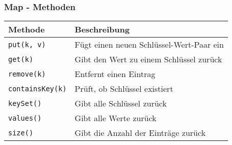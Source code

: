 \documentclass{../../presentation}
\begin{document}
\begin{frame}
	\frametitle{Map - Methoden}
	\begin{table}[h]
		\centering
		\begin{tabular}{l l}
			\rowcolor{tablehead}
			\textbf{Methode}        & \textbf{Beschreibung}                    \\
			\hline
			\texttt{put(k, v)}      & Fügt einen neuen Schlüssel-Wert-Paar ein \\
			\texttt{get(k)}         & Gibt den Wert zu einem Schlüssel zurück  \\
			\texttt{remove(k)}      & Entfernt einen Eintrag                   \\
			\texttt{containsKey(k)} & Prüft, ob Schlüssel existiert            \\
			\texttt{keySet()}       & Gibt alle Schlüssel zurück               \\
			\texttt{values()}       & Gibt alle Werte zurück                   \\
			\texttt{size()}         & Gibt die Anzahl der Einträge zurück      \\
		\end{tabular}
	\end{table}
\end{frame}
\end{document}
